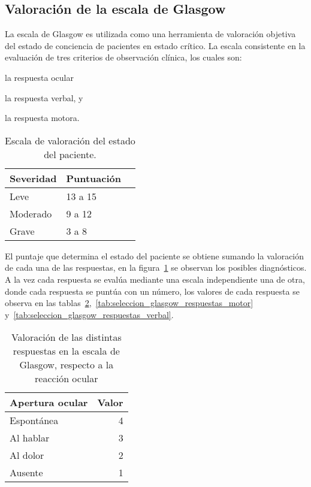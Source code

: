 \subsection{Valoración de la escala de Glasgow}
\label{sec:glasgow}

La escala de Glasgow es utilizada como una herramienta de valoración objetiva
del estado de conciencia de pacientes en estado crítico\cite{protocolo}. La
escala consistente en la evaluación de tres criterios de observación clínica,
los cuales son: 
\begin{enumerate*}
\item la respuesta ocular
\item la respuesta verbal, y
\item la respuesta motora.
\end{enumerate*}

\begin{table}[!hbt]
\centering
\begin{tabular}{llr}
\toprule
\textbf{Severidad} & 
\textbf{Puntuación} \\ 
\midrule
 Leve & 13 a 15 \\
 Moderado & 9 a 12 \\
 Grave & 3 a 8 \\
\bottomrule
\end{tabular}
\caption{Escala de valoración del estado del paciente\cite{helmick2007mild}.}
\label{tab:seleccion_glasgow_estado}
\end{table}

El puntaje que determina el estado del paciente se obtiene sumando la valoración
de cada una de las respuestas, en la figura~\ref{tab:seleccion_glasgow_estado}
se observan los posibles diagnósticos. A la vez cada respuesta se evalúa
mediante una escala independiente una de otra, donde cada respuesta se puntúa
con un número\cite{glasgow:doc}, los valores de cada respuesta se observa en las
tablas~\ref{tab:seleccion_glasgow_respuestas_ocular},~\ref{tab:seleccion_glasgow_respuestas_motor}
y~\ref{tab:seleccion_glasgow_respuestas_verbal}.

\begin{table}[!hbt]
\centering
\begin{tabular}{lr}
\toprule
\textbf{Apertura ocular} & \textbf{Valor} \\
\midrule
Espontánea & 4 \\
Al hablar & 3 \\
Al dolor & 2 \\
Ausente & 1 \\
\bottomrule
\end{tabular}
\caption{Valoración de las distintas respuestas en la escala de Glasgow,
    respecto a la reacción ocular}
\label{tab:seleccion_glasgow_respuestas_ocular}
\end{table}

